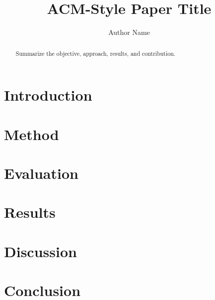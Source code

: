 \documentclass[sigconf,nonacm]{acmart}
\title{ACM-Style Paper Title}
\author{Author Name}
\affiliation{\institution{Institution}\country{Country}}
\begin{document}
\begin{abstract}
Summarize the objective, approach, results, and contribution.
\end{abstract}

\maketitle

\section{Introduction}
\section{Method}
\section{Evaluation}
\section{Results}
\section{Discussion}
\section{Conclusion}

% 
% 
\end{document}
